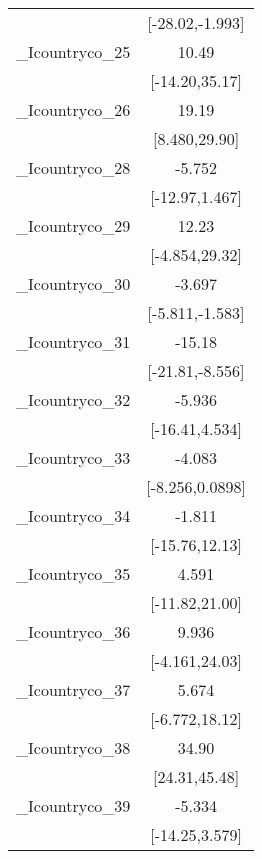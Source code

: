{\begin{tabular}{l*{1}{c}}
            &       [-28.02,-1.993]         \\
[1em]
\_Icountryco\_25&                 10.49         \\
            &        [-14.20,35.17]         \\
[1em]
\_Icountryco\_26&                 19.19\sym{***}\\
            &         [8.480,29.90]         \\
[1em]
\_Icountryco\_28&                -5.752         \\
            &        [-12.97,1.467]         \\
[1em]
\_Icountryco\_29&                 12.23         \\
            &        [-4.854,29.32]         \\
[1em]
\_Icountryco\_30&                -3.697\sym{***}\\
            &       [-5.811,-1.583]         \\
[1em]
\_Icountryco\_31&                -15.18\sym{***}\\
            &       [-21.81,-8.556]         \\
[1em]
\_Icountryco\_32&                -5.936         \\
            &        [-16.41,4.534]         \\
[1em]
\_Icountryco\_33&                -4.083         \\
            &       [-8.256,0.0898]         \\
[1em]
\_Icountryco\_34&                -1.811         \\
            &        [-15.76,12.13]         \\
[1em]
\_Icountryco\_35&                 4.591         \\
            &        [-11.82,21.00]         \\
[1em]
\_Icountryco\_36&                 9.936         \\
            &        [-4.161,24.03]         \\
[1em]
\_Icountryco\_37&                 5.674         \\
            &        [-6.772,18.12]         \\
[1em]
\_Icountryco\_38&                 34.90\sym{***}\\
            &         [24.31,45.48]         \\
[1em]
\_Icountryco\_39&                -5.334         \\
            &        [-14.25,3.579]         \\

\end{tabular}}
